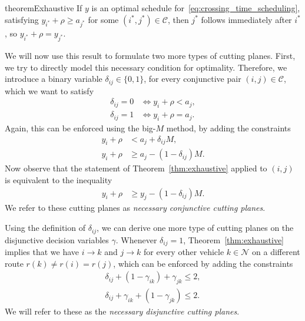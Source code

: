 \documentclass[a4paper]{report}
\theoremstyle{definition}
\theoremstyle{plain}
\begin{document}
\begin{restatable}{theorem}{Exhaustive}\label{thm:exhaustive}
  If $y$ is an optimal schedule for~\eqref{eq:crossing_time_scheduling},
  satisfying $y_{i^{*}} + \rho \geq a_{j^{*}}$ for some $(i^{*},j^{*}) \in \mathcal{C}$, then $j^{*}$
  follows immediately after $i^{*}$, so $y_{i^{*}} + \rho = y_{j^{*}}$.
\end{restatable}

We will now use this result to formulate two more types of cutting planes.
First, we try to directly model this necessary condition for optimality.
Therefore, we introduce a binary variable $\delta_{ij} \in \{0, 1\}$, for every
conjunctive pair $(i,j) \in \mathcal{C}$, which we want to satisfy
\begin{subequations}
\begin{align}
  \delta_{ij} = 0 &\iff y_{i} + \rho < a_{j} , \\
  \delta_{ij} = 1 &\iff y_{i} + \rho = a_{j} .
\end{align}
\end{subequations}
Again, this can be enforced using the big-$M$ method, by adding the constraints
\begin{subequations}
\begin{align}
  y_{i} + \rho &< a_{j} + \delta_{ij}M , \\
  y_{i} + \rho &\geq a_{j} - (1 - \delta_{ij}) M .
\end{align}
\end{subequations}
Now observe that the statement of Theorem~\ref{thm:exhaustive} applied to $(i,j)$ is equivalent
to the inequality
\begin{align}
  y_{i} + \rho &\geq y_{j} - (1 - \delta_{ij}) M .
\end{align}
We refer to these cutting planes as \textit{necessary conjunctive cutting planes}.

Using the definition of $\delta_{ij}$, we can derive one more type of cutting planes
on the disjunctive decision variables $\gamma$. Whenever $\delta_{ij} = 1$,
Theorem~\ref{thm:exhaustive} implies that we have $i \rightarrow k$ and $j \rightarrow k$ for every
other vehicle $k \in \mathcal{N}$ on a different route $r(k) \neq r(i) = r(j)$,
which can be enforced by adding the constraints
\begin{subequations}
\begin{align}
  \delta_{ij} + (1 - \gamma_{ik}) + \gamma_{jk} \leq 2 , \\
  \delta_{ij} + \gamma_{ik} + (1 - \gamma_{jk}) \leq 2 .
\end{align}
\end{subequations}
We will refer to these as the \textit{necessary disjunctive cutting planes}.
\end{document}
